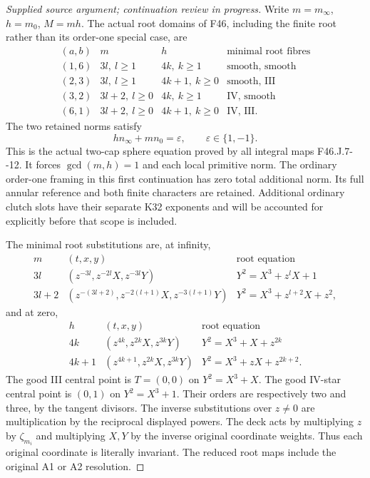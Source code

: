 \begin{proof}[Supplied source argument; continuation review in progress]
Write \(m=m_\infty\), \(h=m_0\), \(M=mh\). The actual root domains of
F46, including the finite root rather than its order-one special case, are
\[
\begin{array}{c|c|c|c}
 (a,b)&m&h&\text{minimal root fibres}\\ \hline
 (1,6)&3l,\ l\ge1&4k,\ k\ge1&\text{smooth, smooth}\\
 (2,3)&3l,\ l\ge1&4k+1,\ k\ge0&\text{smooth, III}\\
 (3,2)&3l+2,\ l\ge0&4k,\ k\ge1&\text{IV, smooth}\\
 (6,1)&3l+2,\ l\ge0&4k+1,\ k\ge0&\text{IV, III}.
\end{array}                                                        \tag{RJC.2}
\]
The two retained norms satisfy
\[
 hn_\infty+mn_0=\varepsilon,\qquad \varepsilon\in\{1,-1\}.             \tag{RJC.3}
\]
This is the actual two-cap sphere equation proved by all integral maps
F46.J.7-\/-12. It forces \(\gcd(m,h)=1\) and each local primitive norm.
The ordinary order-one framing in this first continuation has zero total
additional norm. Its full annular reference and both finite characters
are retained. Additional ordinary clutch slots have their separate
K32 exponents and will be accounted for explicitly before that scope is
included.

The minimal root substitutions are, at infinity,
\[
\begin{array}{c|c|c}
m&(t,x,y)&\text{root equation}\\ \hline
3l&(z^{-3l},z^{-2l}X,z^{-3l}Y)&Y^2=X^3+z^lX+1\\
3l+2&(z^{-(3l+2)},z^{-2(l+1)}X,z^{-3(l+1)}Y)
 &Y^2=X^3+z^{l+2}X+z^2,
\end{array}                                                        \tag{RJC.4}
\]
and at zero,
\[
\begin{array}{c|c|c}
h&(t,x,y)&\text{root equation}\\ \hline
4k&(z^{4k},z^{2k}X,z^{3k}Y)&Y^2=X^3+X+z^{2k}\\
4k+1&(z^{4k+1},z^{2k}X,z^{3k}Y)
 &Y^2=X^3+zX+z^{2k+2}.
\end{array}                                                        \tag{RJC.5}
\]
The good III central point is \(T=(0,0)\) on \(Y^2=X^3+X\).
The good IV-star central point is \((0,1)\) on \(Y^2=X^3+1\).
Their orders are respectively two and three, by the tangent divisors.
The inverse substitutions over \(z\ne0\) are multiplication by the
reciprocal displayed powers. The deck acts by multiplying \(z\) by
\(\zeta_{m_i}\) and multiplying \(X,Y\) by the inverse original
coordinate weights. Thus each original coordinate is literally
invariant. The reduced root maps include the original A1 or A2
resolution.


\end{proof}
